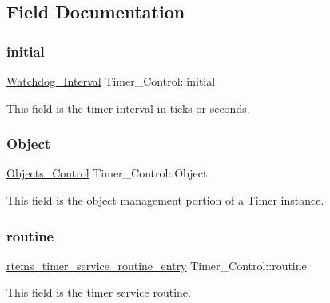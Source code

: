 \subsection{Field Documentation}
\mbox{\label{structTimer__Control_ac4117b72be2935549e329123b4236f73}} 
\subsubsection{\texorpdfstring{initial}{initial}}
{\footnotesize\ttfamily \mbox{\hyperlink{group__RTEMSScoreWatchdog_gaa1834fd7531ca9bb5c4ca6fd990388d5}{Watchdog\+\_\+\+Interval}} Timer\+\_\+\+Control\+::initial}

This field is the timer interval in ticks or seconds. \mbox{\label{structTimer__Control_ac52a39fd9574c2b645f46c95c62cfe06}} 
\subsubsection{\texorpdfstring{Object}{Object}}
{\footnotesize\ttfamily \mbox{\hyperlink{structObjects__Control}{Objects\+\_\+\+Control}} Timer\+\_\+\+Control\+::\+Object}

This field is the object management portion of a Timer instance. \mbox{\label{structTimer__Control_ac0cd6a66f0e6ca0dea7d3fad029e6750}} 
\subsubsection{\texorpdfstring{routine}{routine}}
{\footnotesize\ttfamily \mbox{\hyperlink{group__ClassicTimer_gab7851346dd520066ddc58a25de671f51}{rtems\+\_\+timer\+\_\+service\+\_\+routine\+\_\+entry}} Timer\+\_\+\+Control\+::routine}

This field is the timer service routine. \mbox{\label{structTimer__Control_a7589eaff505e5136ca37447275e76948}} 
